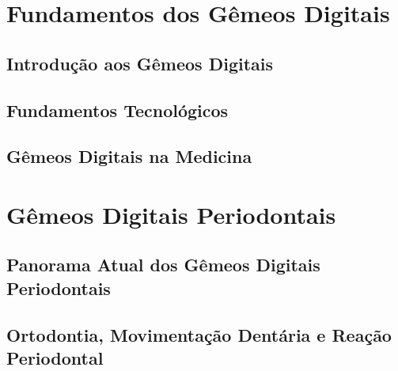 \documentclass[12pt,a4paper,oneside,openright]{abntex2}
\theoremstyle{definition}
\begin{document}



%
%
%
%
%

\listoffigures*
\cleardoublepage

\listoftables*
\cleardoublepage

\begingroup
\footnotesize
\lstlistoflistings
\endgroup
\cleardoublepage

\tableofcontents*
\cleardoublepage

\textual

\part{Fundamentos dos Gêmeos Digitais}
\chapter{Introdução aos Gêmeos Digitais} \label{ch:introducao}

\chapter{Fundamentos Tecnológicos} \label{ch:fundamentos}

\chapter{Gêmeos Digitais na Medicina} \label{ch:medicina}


\part{Gêmeos Digitais Periodontais}
\chapter{Panorama Atual dos Gêmeos Digitais Periodontais} \label{ch:panorama}

\chapter{Ortodontia, Movimentação Dentária e Reação Periodontal} \label{ch:ortodontia}

\end{document}

